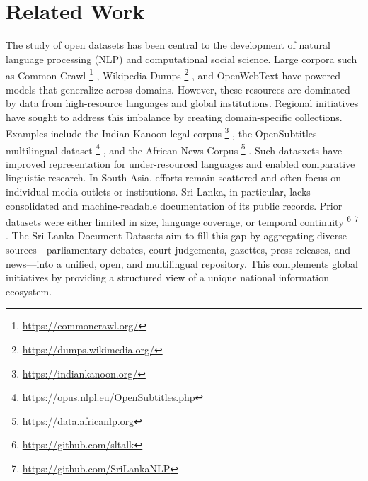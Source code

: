 \documentclass[10pt,a4paper]{article}%
\begin{document}
%
\section{Related Work}%
\label{sec:RelatedWork}%
The study of open datasets has been central to the development of natural language processing (NLP) and computational social science. Large corpora such as Common Crawl%
\footnote{\href{https://commoncrawl.org/}{https://commoncrawl.org/}}%
, Wikipedia Dumps%
\footnote{\href{https://dumps.wikimedia.org/}{https://dumps.wikimedia.org/}}%
, and OpenWebText%
\citep{openwebtext2019}%
have powered models that generalize across domains. However, these resources are dominated by data from high{-}resource languages and global institutions.%
\newline%
\newline%
Regional initiatives have sought to address this imbalance by creating domain{-}specific collections. Examples include the Indian Kanoon legal corpus%
\footnote{\href{https://indiankanoon.org/}{https://indiankanoon.org/}}%
, the OpenSubtitles multilingual dataset%
\footnote{\href{https://opus.nlpl.eu/OpenSubtitles.php}{https://opus.nlpl.eu/OpenSubtitles.php}}%
, and the African News Corpus%
\footnote{\href{https://data.africanlp.org}{https://data.africanlp.org}}%
. Such datasxets have improved representation for under{-}resourced languages and enabled comparative linguistic research.%
\newline%
\newline%
In South Asia, efforts remain scattered and often focus on individual media outlets or institutions. Sri Lanka, in particular, lacks consolidated and machine{-}readable documentation of its public records. Prior datasets were either limited in size, language coverage, or temporal continuity%
\footnote{\href{https://github.com/sltalk}{https://github.com/sltalk}}%
%
\footnote{\href{https://github.com/SriLankaNLP}{https://github.com/SriLankaNLP}}%
.%
\newline%
\newline%
The Sri Lanka Document Datasets aim to fill this gap by aggregating diverse sources—parliamentary debates, court judgements, gazettes, press releases, and news—into a unified, open, and multilingual repository. This complements global initiatives by providing a structured view of a unique national information ecosystem.%
\newline%
\newline

%
\end{document}
